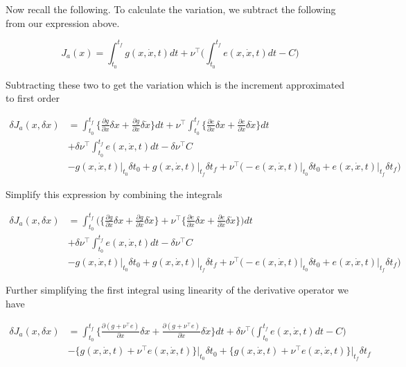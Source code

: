 \documentclass[11pt,letterpaper,onecolumn,notitlepage]{article}
\begin{document}
  Now recall the following.
  To calculate the variation, we subtract the following from our expression above.

  \begin{equation*}
    J_{a}(x)=\int_{t_{0}}^{t_{f}}g(x,\dot{x},t)dt+\nu^{\top}\biggr(\int_{t_{0}}^{t_{f}}e(x,\dot{x},t)dt-C\biggr)
  \end{equation*}

  Subtracting these two to get the variation which is the increment approximated to first order

  \begin{align*}
    \delta J_{a}(x,\delta x)&=
    \int_{t_{0}}^{t_{f}}\biggr\{\frac{\partial{}g}{\partial{}x}\delta x+\frac{\partial{}g}{\partial\dot{x}}\delta\dot{x}\biggr\}dt
    +\nu^{\top}\int_{t_{0}}^{t_{f}}\biggr\{\frac{\partial{}e}{\partial{}x}\delta x+\frac{\partial{}e}{\partial\dot{x}}\delta\dot{x}\biggr\}dt \\
    &+\delta\nu^{\top}\int_{t_{0}}^{t_{f}}e(x,\dot{x},t)dt-\delta\nu^{\top}C \\
    &-g(x,\dot{x},t)\biggr|_{t_{0}}\delta t_{0}
    +g(x,\dot{x},t)\biggr|_{t_{f}}\delta t_{f}
    +\nu^{\top}\biggr(
    -e(x,\dot{x},t)\biggr|_{t_{0}}\delta t_{0}
    +e(x,\dot{x},t)\biggr|_{t_{f}}\delta t_{f}
    \biggr)
  \end{align*}

  Simplify this expression by combining the integrals

  \begin{align*}
    \delta J_{a}(x,\delta x)&=
    \int_{t_{0}}^{t_{f}}\biggr(\biggr\{\frac{\partial{}g}{\partial{}x}\delta x+\frac{\partial{}g}{\partial\dot{x}}\delta\dot{x}\biggr\}
    +\nu^{\top}\biggr\{\frac{\partial{}e}{\partial{}x}\delta x+\frac{\partial{}e}{\partial\dot{x}}\delta\dot{x}\biggr\}\biggr)dt \\
    &+\delta\nu^{\top}\int_{t_{0}}^{t_{f}}e(x,\dot{x},t)dt-\delta\nu^{\top}C \\
    &-g(x,\dot{x},t)\biggr|_{t_{0}}\delta t_{0}
    +g(x,\dot{x},t)\biggr|_{t_{f}}\delta t_{f}
    +\nu^{\top}\biggr(
    -e(x,\dot{x},t)\biggr|_{t_{0}}\delta t_{0}
    +e(x,\dot{x},t)\biggr|_{t_{f}}\delta t_{f}
    \biggr)
  \end{align*}

  Further simplifying the first integral using linearity of the derivative operator we have

  \begin{align*}
    \delta J_{a}(x,\delta x)&=
    \int_{t_{0}}^{t_{f}}\biggr\{\frac{\partial(g+\nu^{\top}e)}{\partial{}x}\delta x+\frac{\partial(g+\nu^{\top}e)}{\partial\dot{x}}\delta\dot{x}\biggr\}dt
    +\delta\nu^{\top}\biggr(\int_{t_{0}}^{t_{f}}e(x,\dot{x},t)dt-C\biggr) \\
    &-\biggr\{g(x,\dot{x},t)+\nu^{\top}e(x,\dot{x},t)\biggr\}\biggr|_{t_{0}}\delta t_{0}
    +\biggr\{g(x,\dot{x},t)+\nu^{\top}e(x,\dot{x},t)\biggr\}\biggr|_{t_{f}}\delta t_{f}
  \end{align*}
\end{document}
